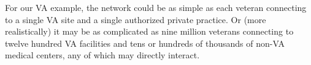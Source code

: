 %
%
%

For our VA example, the network could be as simple as each veteran connecting to a single VA site and a single authorized private practice.
Or (more realistically) it may be as complicated as nine million veterans connecting to twelve hundred VA facilities and tens or hundreds of thousands of non-VA medical centers, any of which may directly interact.
